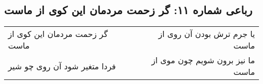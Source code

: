 \begin{center}
\section*{رباعی شماره ۱۱: گر زحمت مردمان این کوی از ماست}
\label{sec:011}
\begin{longtable}{l p{0.5cm} r}
گر زحمت مردمان این کوی از ماست
&&
یا جرم ترش بودن آن روی از ماست
\\
فردا متغیر شود آن روی چو شیر
&&
ما نیز برون شویم چون موی از ماست
\\
\end{longtable}
\end{center}
